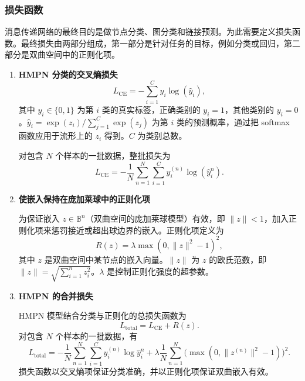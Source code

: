 \subsubsection{损失函数}
消息传递网络的最终目的是做节点分类、图分类和链接预测。为此需要定义损失函数。最终损失由两部分组成，第一部分是针对任务的目标，例如分类或回归，第二部分是双曲空间中的正则化项。
\begin{enumerate}
  \item \textbf{HMPN 分类的交叉熵损失}
  \begin{equation*}
    L_{\mathrm{CE}}=-\sum_{i=1}^{C} y_i\log(\hat y_i),
    \tag{2.144}\label{eq:2.144}
  \end{equation*}
  其中 $y_i\in\{0,1\}$ 为第 $i$ 类的真实标签，正确类别的 $y_i=1$，其他类别的 $y_i=0$。$\hat y_i=\exp(z_i)/\sum_{j=1}^{C}\exp(z_j)$ 为第 $i$ 类的预测概率，通过把 softmax 函数应用于流形上的 $z_i$ 得到。$C$ 为类别总数。

  对包含 $N$ 个样本的一批数据，整批损失为
  \begin{equation*}
    L_{\mathrm{CE}}=-\frac1N\sum_{n=1}^{N}\sum_{i=1}^{C}
                    y_i^{(n)}\log(\hat y_i^n).
    \tag{2.145}\label{eq:2.145}
  \end{equation*}
  \item \textbf{使嵌入保持在庞加莱球中的正则化项}

  为保证嵌入 $z\in\mathbb B^n$（双曲空间的庞加莱球模型）有效，即 $\lVert z\rVert<1$，加入正则化项来惩罚接近或超出球边界的嵌入。正则化项定义为
  \begin{equation*}
    R(z)=\lambda\max(0,\lVert z\rVert^2-1)^2,
    \tag{2.146}\label{eq:2.146}
  \end{equation*}
  其中 $z$ 是双曲空间中某节点的嵌入向量。$\lVert z\rVert$ 为 $z$ 的欧氏范数，即 $\lVert z\rVert=\sqrt{\sum_{i=1}^{n}z_i^2}$。$\lambda$ 是控制正则化强度的超参数。
  \item \textbf{HMPN 的合并损失}

  HMPN 模型结合分类与正则化的总损失函数为
  \begin{equation*}
    L_{\mathrm{total}}=L_{\mathrm{CE}}+R(z).
    \tag{2.147}\label{eq:2.147}
  \end{equation*}
  对包含 $N$ 个样本的一批数据，有
  \begin{equation*}
    L_{\mathrm{total}}
      =-\frac1N\sum_{n=1}^{N}\sum_{i=1}^{C} y_i^{(n)}\log\hat y_i^n
       +\lambda\frac1N\sum_{n=1}^{N}
          \bigl(\max(0,\lVert z^{(n)}\rVert^2-1)\bigr)^2.
    \tag{2.148}\label{eq:2.148}
  \end{equation*}
  损失函数以交叉熵项保证分类准确，并以正则化项保证双曲嵌入有效。
\end{enumerate}
